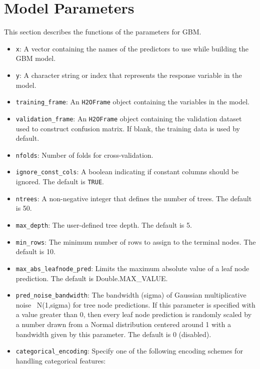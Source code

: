 \waterExampleInR

\waterExampleInPython





\newpage
\section{Model Parameters}
\label{ssec:Model Parameters}
This section describes the functions of the parameters for GBM. 
\begin{itemize}
\item {\texttt{x}}: A vector containing the names of the predictors to use while building the GBM model. 
\item {\texttt{y}}: A character string or index that represents the response variable in the model.  
\item {\texttt{training\_frame}}: An \texttt{H2OFrame} object containing the variables in the model. 
\item {\texttt{validation\_frame}}: An \texttt{H2OFrame} object containing the validation dataset used to construct confusion matrix. If  blank, the training data is used by default.
\item {\texttt{nfolds}}: Number of folds for cross-validation. 
\item {\texttt{ignore\_const\_cols}}: A boolean indicating if constant columns should be ignored.  The default is  {\texttt{TRUE}}.
\item {\texttt{ntrees}}: A non-negative integer that defines the number of trees. The default is 50.
\item {\texttt{max\_depth}}: The user-defined tree depth. The default is 5.
\item {\texttt{min\_rows}}: The minimum number of rows to assign to the terminal nodes. The default is 10.
\item {\texttt{max\_abs\_leafnode\_pred}}: Limits the maximum absolute value of a leaf node prediction. The default is Double.MAX\_VALUE.
\item {\texttt{pred\_noise\_bandwidth}}: The bandwidth (sigma) of Gaussian multiplicative noise ~N(1,sigma) for tree node predictions. If this parameter is specified with a value greater than 0, then every leaf node prediction is randomly scaled by a number drawn from a Normal distribution centered around 1 with a bandwidth given by this parameter. The default is 0 (disabled).
\item \texttt{categorical\_encoding}:  Specify one of the following encoding schemes for handling categorical features:

\end{itemize}
